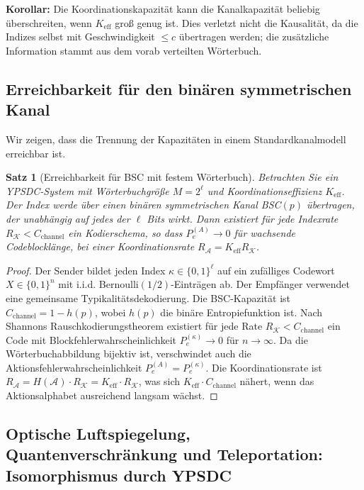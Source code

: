 \documentclass[12pt,a4paper]{article}
\newtheorem{theorem}{Satz}[section]
\theoremstyle{remark}
\newcommand{\Keff}{K_{\mathrm{eff}}}
\begin{document}
	\noindent
	\textbf{Korollar:} Die Koordinationskapazität kann die Kanalkapazität beliebig überschreiten, wenn $\Keff$ groß genug ist. Dies verletzt nicht die Kausalität, da die Indizes selbst mit Geschwindigkeit $\le c$ übertragen werden; die zusätzliche Information stammt aus dem vorab verteilten Wörterbuch.
	
	\subsection{Erreichbarkeit für den binären symmetrischen Kanal}
	\label{subsec:BSC-achievability}
	
	Wir zeigen, dass die Trennung der Kapazitäten in einem Standardkanalmodell erreichbar ist.
	
	\begin{theorem}[Erreichbarkeit für BSC mit festem Wörterbuch]
		Betrachten Sie ein YPSDC-System mit Wörterbuchgröße \(M = 2^\ell\) und Koordinationseffizienz \(K_{\mathrm{eff}}\). Der Index werde über einen binären symmetrischen Kanal BSC\((p)\) übertragen, der unabhängig auf jedes der \(\ell\) Bits wirkt. Dann existiert für jede Indexrate \(R_{\mathcal{K}} < C_{\mathrm{channel}}\) ein Kodierschema, so dass \(P_e^{(A)} \to 0\) für wachsende Codeblocklänge, bei einer Koordinationsrate \(R_{\mathcal{A}} = K_{\mathrm{eff}} R_{\mathcal{K}}\).
	\end{theorem}
	
	\begin{proof}
		Der Sender bildet jeden Index \(\kappa \in \{0,1\}^\ell\) auf ein zufälliges Codewort \(X \in \{0,1\}^n\) mit i.i.d. Bernoulli\((1/2)\)-Einträgen ab. Der Empfänger verwendet eine gemeinsame Typikalitätsdekodierung. Die BSC-Kapazität ist \(C_{\mathrm{channel}} = 1 - h(p)\), wobei \(h(p)\) die binäre Entropiefunktion ist. Nach Shannons Rauschkodierungstheorem existiert für jede Rate \(R_{\mathcal{K}} < C_{\mathrm{channel}}\) ein Code mit Blockfehlerwahrscheinlichkeit \(P_e^{(\kappa)} \to 0\) für \(n \to \infty\). Da die Wörterbuchabbildung bijektiv ist, verschwindet auch die Aktionsfehlerwahrscheinlichkeit \(P_e^{(A)} = P_e^{(\kappa)}\). Die Koordinationsrate ist \(R_{\mathcal{A}} = H(\mathcal{A}) \cdot R_{\mathcal{K}} = K_{\mathrm{eff}} \cdot R_{\mathcal{K}}\), was sich \(K_{\mathrm{eff}} \cdot C_{\mathrm{channel}}\) nähert, wenn das Aktionsalphabet ausreichend langsam wächst.
	\end{proof}
	
	\subsection{Optische Luftspiegelung, Quantenverschränkung und Teleportation: Isomorphismus durch YPSDC}
	\label{subsec:mirage-ypsdc}
	
\end{document}
